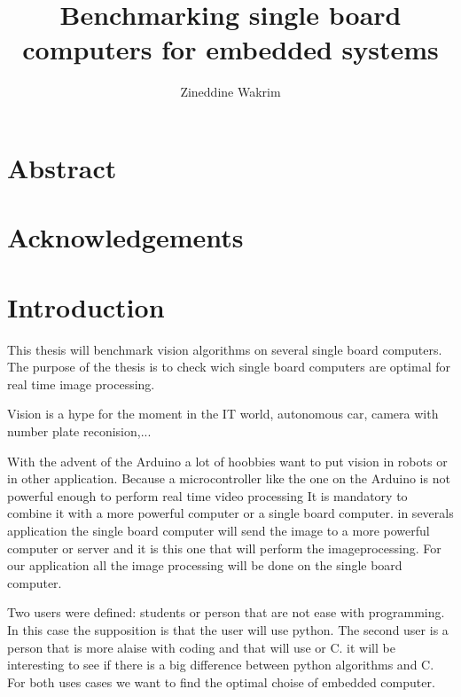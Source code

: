 \documentclass[english]{book_template} %
\title{Benchmarking single board computers for embedded systems}
\author {Zineddine Wakrim} %
\begin{document}
\maketitle
\newpage
  \null
\chapter*{Abstract}
\newpage
  \null
\chapter*{Acknowledgements}

\newpage
  \null

\tableofcontents
\listoffigures
\listoftables

\newpage
  \null

\chapter{Introduction} %

This thesis will benchmark vision algorithms on several single board computers. The purpose of the thesis is to check wich single board computers are optimal for real time image processing. 

Vision is a hype for the moment in the IT world, autonomous car, camera with number plate reconision,...



With the advent of the Arduino a lot of hoobbies want to put vision in robots or in other application. Because a microcontroller like the one on the Arduino is not powerful enough to perform real time video processing It is mandatory to combine it with a more powerful computer or a single board computer. in severals application the single board computer will send the image to a more powerful computer or server and it is this one that will perform the imageprocessing. For our application all the image processing will be done on the single board computer.

Two users were defined: students or person that are not ease with programming. In this case the supposition is that the user will use python. The second user is a person that is more alaise with coding and that will use or C. it will be interesting to see if there is a big difference between python algorithms and C. For both uses cases we want to find the optimal choise of embedded computer. 
\end{document}
